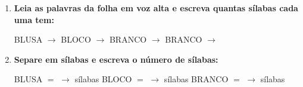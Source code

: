 \begin{exercicio}
\begin{enumerate}[resume]
  \item \textbf{Leia as palavras da folha em voz alta e escreva quantas sílabas cada uma tem:}

  \begin{center}
  BLUSA $\rightarrow$ \underline{\hspace{1cm}} \quad BLOCO $\rightarrow$ \underline{\hspace{1cm}} \quad BRANCO $\rightarrow$ \underline{\hspace{1cm}} \quad BRANCO $\rightarrow$ \underline{\hspace{1cm}}
  \end{center}

  \item \textbf{Separe em sílabas e escreva o número de sílabas:}
  \begin{center}
  BLUSA $=$ \underline{\hspace{1.2cm}} $\rightarrow$ \underline{\hspace{0.8cm}} sílabas \quad BLOCO $=$ \underline{\hspace{1.2cm}} $\rightarrow$ \underline{\hspace{0.8cm}} sílabas \quad BRANCO $=$ \underline{\hspace{1.2cm}} $\rightarrow$ \underline{\hspace{0.8cm}} sílabas
  \end{center}

\end{enumerate}

\end{exercicio}



